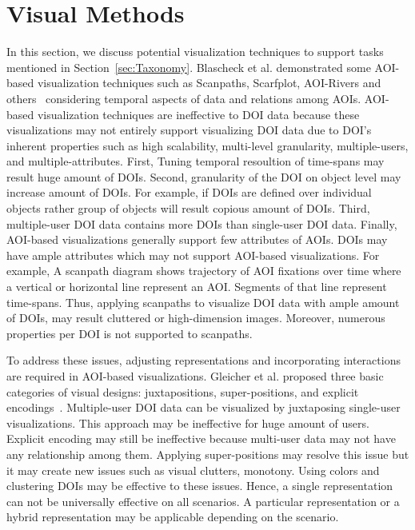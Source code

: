 \section{Visual Methods}
In this section, we discuss potential visualization techniques to support tasks mentioned in Section~\ref{sec:Taxonomy}. Blascheck et al. demonstrated some AOI-based visualization techniques such as Scanpaths, Scarfplot, AOI-Rivers and others~\cite{blascheck2014state} considering temporal aspects of data and relations among AOIs. AOI-based visualization techniques are ineffective to DOI data because these visualizations may not entirely support visualizing DOI data due to DOI's inherent properties such as high scalability, multi-level granularity, multiple-users, and multiple-attributes. First, Tuning temporal resoultion of time-spans may result huge amount of DOIs. Second, granularity of the DOI on object level may increase amount of DOIs. For example, if DOIs are defined over individual objects rather group of objects will result copious amount of DOIs. Third, multiple-user DOI data contains more DOIs than single-user DOI data. Finally, AOI-based visualizations generally support few attributes of AOIs. DOIs may have ample attributes which may not support AOI-based visualizations. For example, A scanpath diagram shows trajectory of AOI fixations over time where a vertical or horizontal line represent an AOI. Segments of that line represent time-spans. Thus, applying scanpaths to visualize DOI data with ample amount of DOIs, may result cluttered or high-dimension images.  Moreover, numerous properties per DOI is not supported to scanpaths. 

To address these issues, adjusting representations and incorporating interactions are required in AOI-based visualizations. Gleicher et al. proposed three basic categories of visual designs: juxtapositions, super-positions, and explicit encodings~\cite{gleicher2011visual}. Multiple-user DOI data can be visualized by juxtaposing single-user visualizations. This approach may be ineffective for huge amount of users. Explicit encoding may still be ineffective because multi-user data may not have any relationship among them. Applying super-positions may resolve this issue but it may create new issues such as visual clutters, monotony. Using colors and clustering DOIs may be effective to these issues. Hence, a single representation can not be universally effective on all scenarios. A particular representation or a hybrid representation may be applicable depending on the scenario. 

